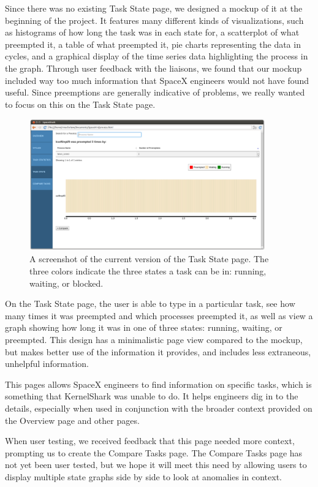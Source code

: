 \documentclass{hmcclinic}
\begin{document}
Since there was no existing Task State page, we designed a mockup of it at the
beginning of the project. It features many different kinds of visualizations,
such as histograms of how long the task was in each state for, a scatterplot of 
what preempted it, a table of what preempted it, pie charts representing the 
data in cycles, and a graphical display of the time series data highlighting 
the process in the graph. Through user feedback with the liaisons, we found 
that our mockup included way too much information that SpaceX engineers would 
not have found useful. Since preemptions are generally
indicative of problems, we really wanted to focus on this on the Task State
page.

\begin{figure}[H]
\begin{center}
\includegraphics[width=4in]{task-state-page.png}
\caption{A screenshot of the current version of the Task State page. The three
colors indicate the three states a task can be in: running, waiting, or blocked.}
\end{center}
\end{figure}

On the Task State page, the user is able to type in a particular task, see
how many times it was preempted and which processes preempted it, as well as
view a graph showing how long it was in one of three states: running, waiting,
or preempted. This design has a minimalistic page view compared to the mockup,
but makes better use of the information it provides, and includes less
extraneous, unhelpful information.

This pages allows SpaceX engineers to find information on specific tasks, which
is something that KernelShark was unable to do. It helps engineers dig in to the
details, especially when used in conjunction with the broader context provided
on the Overview page and other pages.

When user testing, we received feedback that this page needed more context,
prompting us to create the Compare Tasks page. The Compare Tasks page has not
yet been user tested, but we hope it will meet this need by allowing users to
display multiple state graphs side by side to look at anomalies in context.
\end{document}
